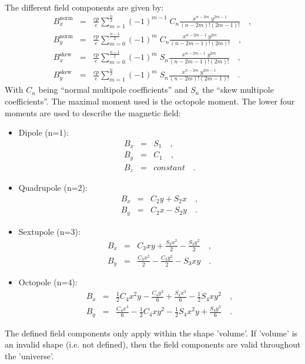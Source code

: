 The different field components are given by:  
\begin{eqnarray*}
B_{x}^{\mathrm{norm}} &=& \frac{cp}{e} \sum_{m=1}^{\frac{n}{2}} (-1)^{m-1} \; C_n \frac{ x^{n-2 m} \; y^{2 m-1} }{ (n-2 m)!(2 m-1)! } \quad, \\
B_{y}^{\mathrm{norm}} &=& \frac{cp}{e} \sum_{m=0}^{\frac{n-1}{2}} (-1)^m \; C_n \frac{ x^{n-2 m-1} \; y^{2 m} }{ (n-2 m-1)! (2 m)! } \quad, \\
B_{x}^{\mathrm{skew}} &=& \frac{cp}{e} \sum_{m=0}^{\frac{n-1}{2}} (-1)^m \; S_n \frac{ x^{n-2 m-1} \; y^{2 m} }{ (n-2 m-1)! (2 m)! } \quad, \\
B_{y}^{\mathrm{skew}} &=& \frac{cp}{e} \sum_{m=1}^{\frac{n}{2}} (-1)^m \; S_n \frac{ x^{n-2 m} \; y^{2 m-1} }{ (n-2 m)! (2 m-1)! }\quad.
\end{eqnarray*}
With $C_n$ being ``normal multipole coefficients'' and $S_n$ the ``skew multipole coefficients''. The maximal moment used is the octopole moment. The lower four moments are used
to describe the magnetic field:
\begin{itemize}
\item Dipole (n=1):
    \begin{eqnarray*}
        B_x &=& S_1\quad, \\
        B_y &=& C_1\quad, \\
        B_z &=& constant\quad.
    \end{eqnarray*}
\item Quadrupole (n=2):
    \begin{eqnarray*}
        B_x &=& C_2 y+S_2 x\quad, \\
        B_y &=& C_2 x-S_2 y\quad.
    \end{eqnarray*}
\item Sextupole (n=3):
    \begin{eqnarray*}
        B_x         &=& C_3 x y+\frac{S_3 x^2}{2}-\frac{S_3 y^2}{2}\quad, \\
        B_y         &=& \frac{C_3 x^2}{2}-\frac{C_3 y^2}{2}-S_3 x y\quad.
    \end{eqnarray*}

\item Octopole (n=4):
    \begin{eqnarray*}
        B_x &=& \frac{1}{2} C_4 x^2 y-\frac{C_4 y^3}{6}+\frac{S_4 x^3}{6}-\frac{1}{2} S_4 x y^2\quad,\\
        B_y &=& \frac{C_4 x^3}{6}-\frac{1}{2} C_4 x y^2-\frac{1}{2} S_4 x^2 y+\frac{S_4 y^3}{6}\quad.
    \end{eqnarray*}
\end{itemize}
The defined field components only apply within the shape 'volume'. If 'volume' is an invalid shape (i.e. not defined), then the field components are valid throughout the 'universe'.

